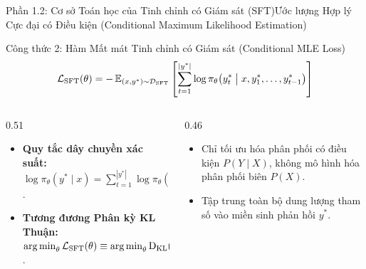 \begin{frame}{Phần 1.2: Cơ sở Toán học của Tinh chỉnh có Giám sát (SFT)}{Ước lượng Hợp lý Cực đại có Điều kiện (Conditional Maximum Likelihood Estimation)}
  \begin{block}{Công thức 2: Hàm Mất mát Tinh chỉnh có Giám sát (Conditional MLE Loss)}
    \[
      \mathcal{L}_{\text{SFT}}(\theta) = -\operatorname{\mathbb{E}}_{(x, y^*) \sim \mathcal{D}_{\text{SFT}}} \left[ \sum_{t=1}^{|y^*|} \log \pi_\theta\big(y_t^* \;\big|\; x, y_1^*, \dots, y_{t-1}^*\big) \right]
    \]
  \end{block}

  \begin{columns}[T,onlytextwidth]
    \begin{column}{0.51\textwidth}
      \small
      \begin{itemize}\setlength{\itemsep}{6pt}
        \item \textbf{Quy tắc dây chuyền xác suất:}
          $\log \pi_\theta(y^* \mid x) = \sum_{t=1}^{|y^*|} \log \pi_\theta(y_t^* \mid x, y_{<t}^*)$.
        \item \textbf{Tương đương Phân kỳ KL Thuận:}
          $\operatorname*{arg\,min}_\theta \mathcal{L}_{\text{SFT}}(\theta) \equiv \operatorname*{arg\,min}_\theta \operatorname{D_{\mathrm{KL}}}(P_{\text{data}} \parallel \pi_\theta)$.
      \end{itemize}
    \end{column}
    \begin{column}{0.46\textwidth}
      \small
      \begin{itemize}\setlength{\itemsep}{6pt}
        \item Chỉ tối ưu hóa phân phối có điều kiện $P(Y \mid X)$, không mô hình hóa phân phối biên $P(X)$.
        \item Tập trung toàn bộ dung lượng tham số vào miền sinh phản hồi $y^*$.
      \end{itemize}
    \end{column}
  \end{columns}
\end{frame}


